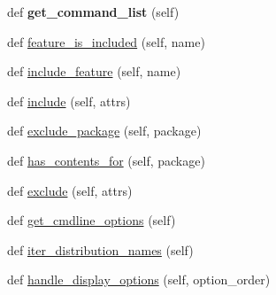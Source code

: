 \begin{DoxyCompactItemize}
\item 
\mbox{\label{classsetuptools_1_1dist_1_1_distribution_ad385b9a96d699328200db4d891549721}} 
def {\bfseries get\+\_\+command\+\_\+list} (self)
\item 
def \hyperlink{classsetuptools_1_1dist_1_1_distribution_a8de1a9e80efdb1b08e3c12e4456797a2}{feature\+\_\+is\+\_\+included} (self, name)
\item 
def \hyperlink{classsetuptools_1_1dist_1_1_distribution_ab1eb484dfaf40518287829723ef5a456}{include\+\_\+feature} (self, name)
\item 
def \hyperlink{classsetuptools_1_1dist_1_1_distribution_a2306d43f883208c7a145e26056ee4fc9}{include} (self, attrs)
\item 
def \hyperlink{classsetuptools_1_1dist_1_1_distribution_afc5f2e32b85d40dbd223aa3e1bd33cf9}{exclude\+\_\+package} (self, package)
\item 
def \hyperlink{classsetuptools_1_1dist_1_1_distribution_a0d99480ae4beb9ec35a2c99a46721af6}{has\+\_\+contents\+\_\+for} (self, package)
\item 
def \hyperlink{classsetuptools_1_1dist_1_1_distribution_a5245d1b73f3cb0241bb7cef9644e9747}{exclude} (self, attrs)
\item 
def \hyperlink{classsetuptools_1_1dist_1_1_distribution_ac8c369e93a63e253f99d4d2ae842b250}{get\+\_\+cmdline\+\_\+options} (self)
\item 
def \hyperlink{classsetuptools_1_1dist_1_1_distribution_a598f1821d0e4868b2f1863eae1c2c945}{iter\+\_\+distribution\+\_\+names} (self)
\item 
def \hyperlink{classsetuptools_1_1dist_1_1_distribution_ad44e7069904a39a05010160a5b365e4a}{handle\+\_\+display\+\_\+options} (self, option\+\_\+order)
\end{DoxyCompactItemize}
